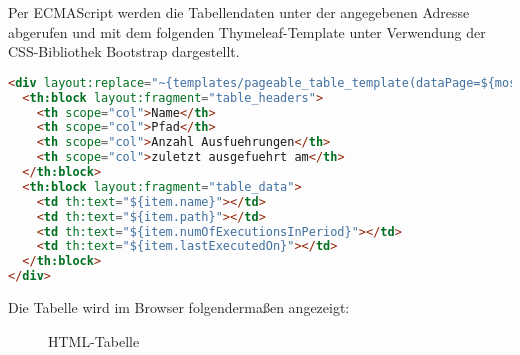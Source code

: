 Per ECMAScript werden die Tabellendaten unter der angegebenen Adresse abgerufen und \ua mit dem folgenden Thymeleaf-Template unter Verwendung der CSS-Bibliothek Bootstrap dargestellt.
\begin{lstlisting}[language=HTML,caption={Tabellen-Fragment}]
<div layout:replace="~{templates/pageable_table_template(dataPage=${mostUsedReports})}">
  <th:block layout:fragment="table_headers">
    <th scope="col">Name</th>
    <th scope="col">Pfad</th>
    <th scope="col">Anzahl Ausfuehrungen</th>
    <th scope="col">zuletzt ausgefuehrt am</th>
  </th:block>
  <th:block layout:fragment="table_data">
    <td th:text="${item.name}"></td>
    <td th:text="${item.path}"></td>
    <td th:text="${item.numOfExecutionsInPeriod}"></td>
    <td th:text="${item.lastExecutedOn}"></td>
  </th:block>
</div>
\end{lstlisting}
Die Tabelle wird im Browser folgendermaßen angezeigt:
\begin{figure}[htb]
	\centering
	\caption{HTML-Tabelle}
	\label{fig:Tabelle}
\end{figure}

